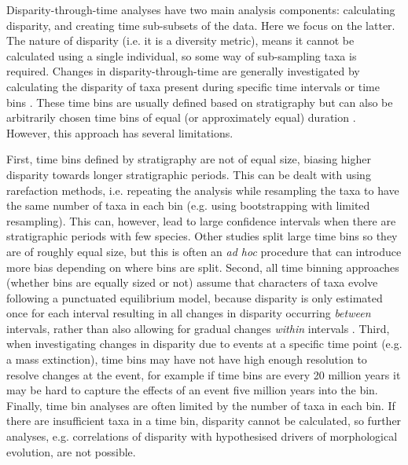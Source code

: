 \documentclass[12pt,a4paper]{article}
\begin{document}
Disparity-through-time analyses have two main analysis components: calculating disparity, and creating time sub-subsets of the data. 
Here we focus on the latter.
The nature of disparity (i.e. it is a diversity metric), means it cannot be calculated using a single individual, so some way of sub-sampling taxa is required.
Changes in disparity-through-time are generally investigated by calculating the disparity of taxa present during specific time intervals or time bins \citep[e.g][]{cisneros2010,prentice2011,Hughes20082013,hopkinsdecoupling2013,bentonmodels2014,bensonfaunal2014}.
These time bins are usually defined based on stratigraphy \citep[e.g.][]{cisneros2010,prentice2011,Hughes20082013,bentonmodels2014} but can also be arbitrarily chosen time bins of equal (or approximately equal) duration \citep{Butler2012,hopkinsdecoupling2013,bensonfaunal2014}.
However, this approach has several limitations.

First, time bins defined by stratigraphy are not of equal size, biasing higher disparity towards longer stratigraphic periods. 
This can be dealt with using rarefaction methods, i.e. repeating the analysis while resampling the taxa to have the same number of taxa in each bin (e.g. using bootstrapping with limited resampling).
This can, however, lead to large confidence intervals when there are stratigraphic periods with few species.
Other studies split large time bins so they are of roughly equal size, but this is often an \textit{ad hoc} procedure that can introduce more bias depending on where bins are split.
Second, all time binning approaches (whether bins are equally sized or not) assume that characters of taxa evolve following a punctuated equilibrium model, because disparity is only estimated once for each interval resulting in all changes in disparity occurring \textit{between} intervals, rather than also allowing for gradual changes \textit{within} intervals \citep[a pattern that is fairly common in the fossil record;][]{Hunt21042015}.
Third, when investigating changes in disparity due to events at a specific time point (e.g. a mass extinction), time bins may have not have high enough resolution to resolve changes at the event, for example if time bins are every 20 million years it may be hard to capture the effects of an event five million years into the bin.
Finally, time bin analyses are often limited by the number of taxa in each bin.
If there are insufficient taxa in a time bin, disparity cannot be calculated, so further analyses, e.g. correlations of disparity with hypothesised drivers of morphological evolution, are not possible.
\end{document}
